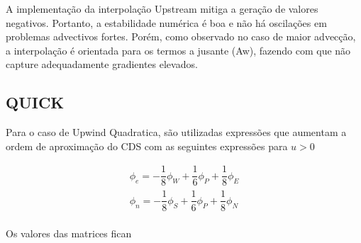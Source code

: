 \documentclass[]{article}
\begin{document}
A implementação da interpolação Upstream mitiga a geração de valores negativos. Portanto, a estabilidade numérica é boa e não há oscilações em problemas advectivos fortes. Porém, como observado no caso de maior advecção, a interpolação é orientada para os termos a jusante (Aw), fazendo com que não capture adequadamente gradientes elevados.

\subsection*{QUICK}

Para o caso de Upwind Quadratica, são utilizadas expressões que aumentam a ordem de aproximação do CDS com as seguintes expressões para $u > 0$

\begin{equation}
	\begin{aligned}
		\phi_e = -\dfrac{1}{8}\phi_W +\dfrac{1}{6}\phi_P +\dfrac{1}{8}\phi_E \\
		\phi_n = -\dfrac{1}{8}\phi_S +\dfrac{1}{6}\phi_P +\dfrac{1}{8}\phi_N
	\end{aligned}
\end{equation}\\

Os valores das matrices fican
\end{document}

